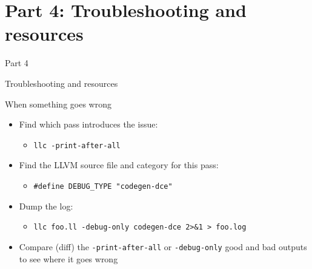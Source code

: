 \section{Part 4: Troubleshooting and resources}

\begin{frame}{Part 4}

Troubleshooting and resources

\end{frame}


\begin{frame}{When something goes wrong}

\begin{itemize}
    \item Find which pass introduces the issue:
    \begin{itemize}
        \item \texttt{llc -print-after-all}
    \end{itemize}
    \item Find the LLVM source file and category for this pass:
    \begin{itemize}
        \item \texttt{\#define DEBUG\_TYPE "codegen-dce"}
    \end{itemize}
    \item Dump the log:
    \begin{itemize}
        \item \texttt{llc foo.ll -debug-only codegen-dce 2>\&1 > foo.log}
    \end{itemize}
    \item Compare (diff) the \texttt{-print-after-all} or \texttt{-debug-only} good and bad outputs to see where it goes wrong
\end{itemize}

\end{frame}


